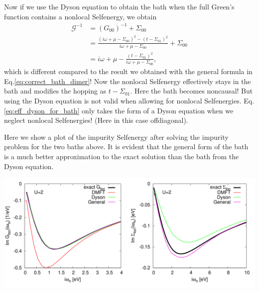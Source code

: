 \documentclass[12pt,a4paper]{scrartcl}
\numberwithin{equation}{section}
\begin{document}
Now if we use the Dyson equation to obtain the bath when the full Green's function contains a nonlocal Selfenergy,
we obtain
\begin{align}
 \mathscr{G}^{-1} 
 &= (G_{00})^{-1} + \Sigma_{00}  \\
 &= \frac{(i\omega + \mu-\Sigma_{00})^{2} -(t-\Sigma_{01})^2}{ i\omega + \mu-\Sigma_{00} }  + \Sigma_{00} \\
 &= i\omega + \mu -  \frac{(t-\Sigma_{01})^2}{i\omega + \mu-\Sigma_{00} } ,
\end{align}
which is different compared to the result we obtained with the general formula in Eq.\eqref{eq:correct_bath_dimer}!
Now the nonlocal Selfenergy effectively stays in the bath and modifies the 
hopping as $t-\Sigma_{01}$. Here the bath becomes noncausal!
But using the Dyson equation is not valid when allowing for 
nonlocal Selfenergies. Eq.\eqref{eq:eff_dyson_for_bath} only takes the form of a Dyson equation when
we neglect nonlocal Selfenergies! (Here in this case offdiagonal).

Here we show a plot of the impurity Selfenergy after solving the impurity problem
for the two baths above. It is evident that the general form of the bath is a much better approximation 
to the exact solution than the bath from the Dyson equation.

\includegraphics[width=1.0\textwidth]{figs/reversebath/dimerbath/gloc_sigma_dyson_general_U2.pdf}
\end{document}
